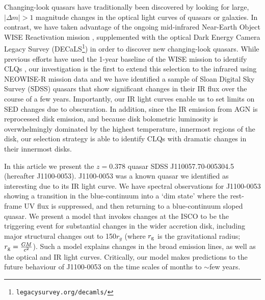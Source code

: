 \documentclass{nature}
\begin{document}
Changing-look quasars have traditionally been discovered by looking
for large, $| \Delta m | >1$ magnitude changes in the optical light
curves of quasars or galaxies. In contrast, we have taken advantage of
the ongoing mid-infrared Near-Earth Object WISE Reactivation mission
\cite[NEOWISE-R; ][]{Mainzer2014, Meisner2017a, Meisner2017b},
supplemented with the optical Dark Energy Camera Legacy Survey
(DECaLS\footnote{{\tt legacysurvey.org/decamls/}}) in order to
discover new changing-look quasars.  While previous efforts have used
the 1-year baseline of the WISE mission to identify CLQs
\cite[e.g.,][]{Assef2017}, our investigation is the first to extend
this selection to the infrared using NEOWISE-R mission data and we
have identified a sample of Sloan Digital Sky Survey (SDSS) quasars
that show significant changes in their IR flux over the course of a
few years. Importantly, our IR light curves enable us to set limits on
SED changes due to obscuration. In addition, since the IR emission
from AGN is reprocessed disk emission, and because disk bolometric
luminosity is overwhelmingly dominated by the highest temperature,
innermost regions of the disk, our selection strategy is able to
identify CLQs with dramatic changes in their innermost disks.

In this article we present the $z=0.378$ quasar SDSS
J110057.70-005304.5 (hereafter J1100-0053).  J1100-0053 was a known
quasar we identified as interesting due to its IR light curve. We have
spectral observations for J1100-0053 showing a transition in the
blue-continuum into a `dim state' where the rest-frame UV flux is
suppressed, and then returning to a blue-continuum sloped quasar.  We
present a model that invokes changes at the ISCO to be the triggering
event for substantial changes in the wider accretion disk, including
major structural changes out to 150$r_{g}$ (where $r_{\rm g}$ is the
gravitational radius; $r_{\rm g}=\frac{GM}{c^2}$).  Such a model
explains changes in the broad emission lines, as well as the optical
and IR light curves. Critically, our model makes predictions to the
future behaviour of J1100-0053 on the time scales of months to
$\sim$few years.
\end{document}
